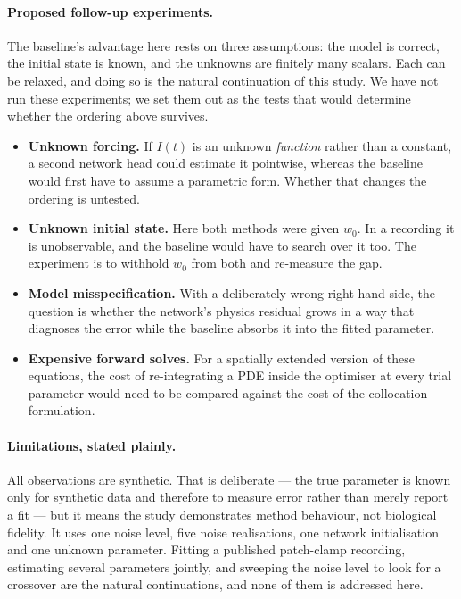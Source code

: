 \paragraph{Proposed follow-up experiments.}
The baseline's advantage here rests on three assumptions: the model is correct, the initial state
is known, and the unknowns are finitely many scalars. Each can be relaxed, and doing so is the
natural continuation of this study. We have not run these experiments; we set them out as the
tests that would determine whether the ordering above survives.

\begin{itemize}[leftmargin=1.4em]
  \item \textbf{Unknown forcing.} If \(I(t)\) is an unknown \emph{function} rather than a
        constant, a second network head could estimate it pointwise, whereas the baseline would
        first have to assume a parametric form. Whether that changes the ordering is untested.
  \item \textbf{Unknown initial state.} Here both methods were given \(w_0\). In a recording it
        is unobservable, and the baseline would have to search over it too. The experiment is to
        withhold \(w_0\) from both and re-measure the gap.
  \item \textbf{Model misspecification.} With a deliberately wrong right-hand side, the question
        is whether the network's physics residual grows in a way that diagnoses the error while
        the baseline absorbs it into the fitted parameter.
  \item \textbf{Expensive forward solves.} For a spatially extended version of these equations,
        the cost of re-integrating a PDE inside the optimiser at every trial parameter would need
        to be compared against the cost of the collocation formulation.
\end{itemize}

\paragraph{Limitations, stated plainly.}
All observations are synthetic. That is deliberate --- the true
parameter is known only for synthetic data and therefore to measure error rather than merely report a fit --- but it means the
study demonstrates method behaviour, not biological fidelity. It uses one noise level, five noise
realisations, one network initialisation and one unknown parameter. Fitting a published
patch-clamp recording, estimating several parameters jointly, and sweeping the noise level to look
for a crossover are the natural continuations, and none of them is addressed here.
